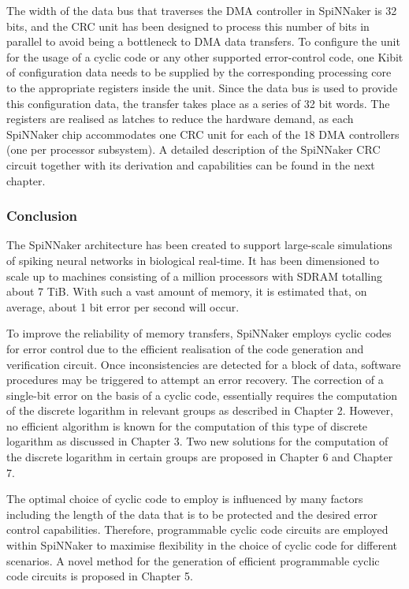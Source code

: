 \documentclass[a4paper, 11pt]{article}
\begin{document}
The width of the data bus that traverses the DMA controller in SpiNNaker is 32 bits, and the CRC unit has been designed to process this number of bits in parallel to avoid being a bottleneck to DMA data transfers. To configure the unit for the usage of a cyclic code or any other supported error-control code, one Kibit of configuration data needs to be supplied by the corresponding processing core to the appropriate registers inside the unit. Since the data bus is used to provide this configuration data, the transfer takes place as a series of 32 bit words. The registers are realised as latches to reduce the hardware demand, as each SpiNNaker chip accommodates one CRC unit for each of the 18 DMA controllers (one per processor subsystem). A detailed description of the SpiNNaker CRC circuit together with its derivation and capabilities can be found in the next chapter.

\subsubsection{Conclusion}
The SpiNNaker architecture has been created to support large-scale simulations of spiking neural networks in biological real-time. It has been dimensioned to scale up to machines consisting of a million processors with SDRAM totalling about 7 TiB. With such a vast amount of memory, it is estimated that, on average, about 1 bit error per second will occur.

To improve the reliability of memory transfers, SpiNNaker employs cyclic codes for error control due to the efficient realisation of the code generation and verification circuit. Once inconsistencies are detected for a block of data, software procedures may be triggered to attempt an error recovery. The correction of a single-bit error on the basis of a cyclic code, essentially requires the computation of the discrete logarithm in relevant groups as described in Chapter 2. However, no efficient algorithm is known for the computation of this type of discrete logarithm as discussed in Chapter 3. Two new solutions for the computation of the discrete logarithm in certain groups are proposed in Chapter 6 and Chapter 7.

The optimal choice of cyclic code to employ is influenced by many factors including the length of the data that is to be protected and the desired error control capabilities. Therefore, programmable cyclic code circuits are employed within SpiNNaker to maximise flexibility in the choice of cyclic code for different scenarios. A novel method for the generation of efficient programmable cyclic code circuits is proposed in Chapter 5.
\end{document}
